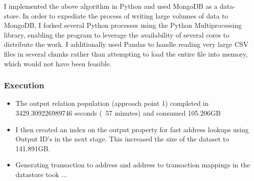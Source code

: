 I implemented the above algorithm in Python and used MongoDB as a data-store. In order to expediate the process of writing large volumes of data to MongoDB, I forked several Python processes using the Python Multiprocessing library, enabling the program to leverage the availability of several cores to distribute the work. I additionally used Pandas to handle reading very large CSV files in several chunks rather than attempting to load the entire file into memory, which would not have been feasible. 

\subsubsection{Execution}
\begin{itemize}
    \item The output relation population (approach point 1) completed in 3429.309226989746 seconds (~57 minutes) and consumed 105.206GB 
    \item I then created an index on the output property for fast address lookups using Output ID's in the next stage. This increased the size of the dataset to 141.891GB. 
    \item Generating transaction to address and address to transaction mappings in the datastore took ... 
    

\end{itemize}{}


